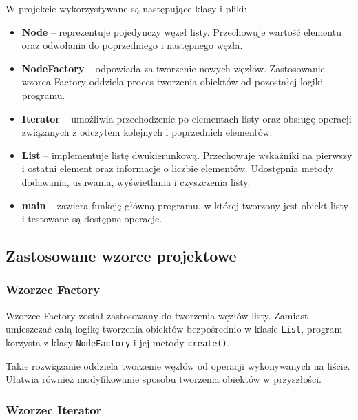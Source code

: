 W projekcie wykorzystywane są następujące klasy i pliki:

\begin{itemize}
    \item \textbf{Node} -- reprezentuje pojedynczy węzeł listy.
    Przechowuje wartość elementu oraz odwołania do poprzedniego
    i następnego węzła.

    \item \textbf{NodeFactory} -- odpowiada za tworzenie nowych
    węzłów. Zastosowanie wzorca Factory oddziela proces tworzenia
    obiektów od pozostałej logiki programu.

    \item \textbf{Iterator} -- umożliwia przechodzenie po elementach
    listy oraz obsługę operacji związanych z odczytem kolejnych
    i poprzednich elementów.

    \item \textbf{List} -- implementuje listę dwukierunkową.
    Przechowuje wskaźniki na pierwszy i ostatni element oraz
    informacje o liczbie elementów. Udostępnia metody dodawania,
    usuwania, wyświetlania i czyszczenia listy.

    \item \textbf{main} -- zawiera funkcję główną programu,
    w której tworzony jest obiekt listy i testowane są
    dostępne operacje.
\end{itemize}

\subsection{Zastosowane wzorce projektowe}

\subsubsection{Wzorzec Factory}

Wzorzec Factory został zastosowany do tworzenia węzłów listy.
Zamiast umieszczać całą logikę tworzenia obiektów bezpośrednio
w klasie \texttt{List}, program korzysta z klasy
\texttt{NodeFactory} i jej metody \texttt{create()}.

Takie rozwiązanie oddziela tworzenie węzłów od operacji
wykonywanych na liście. Ułatwia również modyfikowanie sposobu
tworzenia obiektów w przyszłości.

\subsubsection{Wzorzec Iterator}

